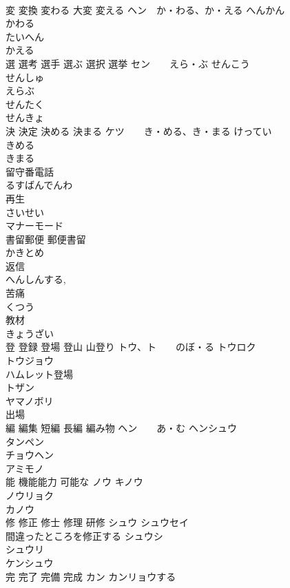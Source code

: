 \documentclass[8pt]{extreport}
\begin{document}
\begin{CJK}{UTF8}{min}
\\	変 変換 変わる 大変 変える	ヘン　か・わる、か・える へんかん 
\\	かわる 
\\	たいへん 
\\	かえる 
\\	選 選考 選手 選ぶ 選択 選挙	セン　　えら・ぶ せんこう 
\\	せんしゅ 
\\	えらぶ 
\\	せんたく
\\	せんきょ
\\	決 決定 決める 決まる	ケツ　　き・める、き・まる けってい　
\\	きめる 
\\	きまる 
\\	留守番電話	
\\	るすばんでんわ
\\	再生	
\\	さいせい
\\	マナーモード	
\\	書留郵便 郵便書留	
\\	かきとめ
\\	返信	
\\	へんしんする, 
\\	苦痛	
\\	くつう
\\	教材	
\\	きょうざい
\\	登 登録 登場 登山 山登り	トウ、ト　　のぼ・る トウロク　
\\	トウジョウ 
\\	ハムレット登場 
\\	トザン 
\\	ヤマノボリ
\\	出場	
\\	編 編集 短編 長編 編み物	ヘン　　あ・む ヘンシュウ 
\\	タンペン　
\\	チョウヘン 
\\	アミモノ 
\\	能 機能能力 可能な	ノウ キノウ　
\\	ノウリョク 
\\	カノウ 
\\	修 修正 修士 修理 研修	シュウ シュウセイ 
\\	間違ったところを修正する シュウシ 
\\	シュウリ 
\\	ケンシュウ 
\\	完 完了 完備 完成	カン カンリョウする 

\end{CJK}
\end{document}
